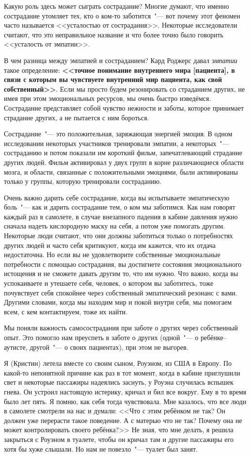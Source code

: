 Какую роль здесь может сыграть сострадание? Многие думают, что именно сострадание утомляет тех, кто о ком-то заботится~"--- вот почему этот феномен часто называется <<усталостью от сострадания>>. Некоторые исследователи считают, что это неправильное название и что более точно было говорить <<усталость от эмпатии>>\cite{102}.

В чем разница между эмпатией и состраданием? Кард Роджерс давал \emph{эмпатии} такое определение: \textbf{<<точное понимание внутреннего мира [пациента], в связи с которым вы чувствуете внутренний мир пациента, как свой собственный>>}\cite{103}. Если мы просто будем резонировать со страданием других, не имея при этом эмоциональных ресурсов, мы очень быстро изведёмся. Сострадание представляет собой чувство нежности и заботы, которое принимает страдание других, а не пытается с ним бороться.

Сострадание~"--- это положительная, заряжающая энергией эмоция. В одном исследовании некоторых участников тренировали эмпатии, а некоторых~"--- состраданию и потом показали им короткий фильм, запечатлевающий страдание других людей\cite{104}. Фильм активировал у двух групп в корне различающиеся области мозга, и области, связанные с положительными эмоциями, были активированы только у группы, которую тренировали состраданию.

Очень важно дарить себе сострадание, когда вы испытываете эмпатическую боль~"--- как и дарить сострадание тем, о ком мы заботимся. Как нам говорят каждый раз в самолете, в случае внезапного падения в кабине давления нужно сначала надеть кислородную маску на себя, а потом уже помогать другим. Некоторые люди считают, что они должны заботиться только о потребностях других людей и часто себя критикуют, когда им кажется, что их отдача недостаточна. Но если вы не удовлетворите собственные эмоциональные потребности с помощью сострадания, вы достигнете состояния эмоционального истощения и не сможете давать другим то, что им нужно. Что важно, когда вы успокаиваете и утешаете себя, человек, о котором вы заботитесь, тоже почувствует себя спокойнее через собственный эмпатический резонанс с вами. Другими словами, когда мы находим мир и покой внутри себя, мы помогаем всем, с кем контактируем, тоже их найти.  

Мы поняли важность самосострадания при заботе о других через собственный опыт. Это помогло нам преуспеть в заботе о других (одной~"--- о ребёнке--аутисте, другой~"--- о своих пациентах), при этом не выгорев.

Я (Кристин) летела вместе со своим сыном, Роуэном, из США в Европу. По какой-то непонятной причине как раз в тот момент, когда в кабине приглушили свет и некоторые пассажиры надеялись заснуть, у Роуэна случилась вспышек гнева. Он устроил настоящую истерику, кричал и бил все вокруг. Ему в то время было лет пять. Я помню, как себя тогда чувствовала. Мне казалось, что все люди в самолете смотрели на нас и думали: <<Что с этим ребёнком не так? Он должен уже перерасти такое поведение. А с матерью что не так? Почему она не может контролировать своего ребёнка?>> Не зная, что мне делать, я решила закрыться с Роуэном в туалете, чтобы он кричал там и другие пассажиры его хотя бы хуже слышали. Но нам не повезло~"--- туалет был занят. 

